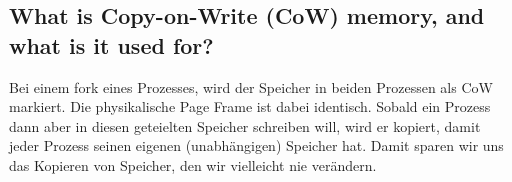 \subsection{What is Copy-on-Write (CoW) memory, and what is it used for?}
Bei einem fork eines Prozesses, wird der Speicher in beiden Prozessen als CoW markiert.
Die physikalische Page Frame ist dabei identisch.
Sobald ein Prozess dann aber in diesen geteielten Speicher schreiben will, wird er kopiert, damit jeder Prozess seinen eigenen (unabhängigen) Speicher hat.
Damit sparen wir uns das Kopieren von Speicher, den wir vielleicht nie verändern.
